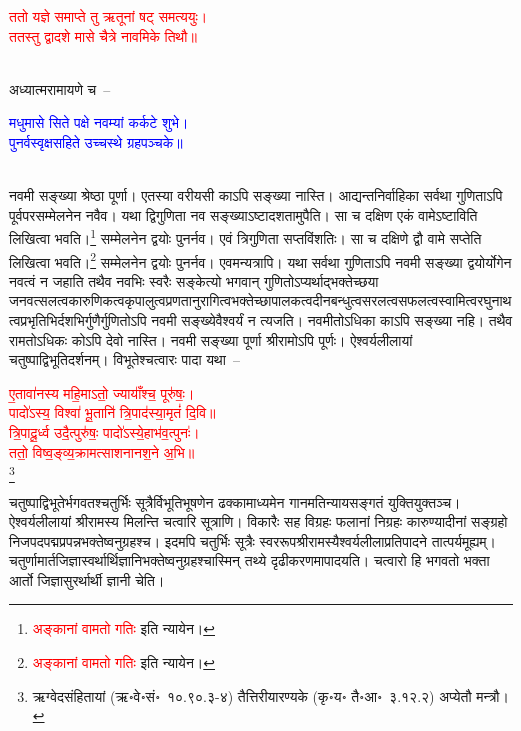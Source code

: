 \centering\textcolor{red}{ततो यज्ञे समाप्ते तु ऋतूनां षट् समत्ययुः।\nopagebreak\\
ततस्तु द्वादशे मासे चैत्रे नावमिके तिथौ॥}\nopagebreak\\
\\
\begin{sloppypar}\justifying\noindent अध्यात्म\-रामायणे च~–\end{sloppypar}
\centering\textcolor{blue}{मधुमासे सिते पक्षे नवम्यां कर्कटे शुभे।\nopagebreak\\
पुनर्वस्वृक्षसहिते उच्चस्थे ग्रहपञ्चके॥}\nopagebreak\\
\\
\begin{sloppypar}\justifying\noindent नवमी सङ्ख्या श्रेष्ठा पूर्णा। एतस्या वरीयसी काऽपि सङ्ख्या नास्ति। आद्यन्त\-निर्वाहिका सर्वथा गुणिताऽपि पूर्व\-पर\-सम्मेलनेन नवैव। यथा द्विगुणिता नव सङ्ख्याऽष्टादशतामुपैति। सा च दक्षिण एकं वामेऽष्टाविति लिखित्वा भवति।\footnote{\textcolor{red}{अङ्कानां वामतो गतिः} इति न्यायेन।} सम्मेलनेन द्वयोः पुनर्नव। एवं त्रि\-गुणिता सप्तविंशतिः। सा च दक्षिणे द्वौ वामे सप्तेति लिखित्वा भवति।\footnote{\textcolor{red}{अङ्कानां वामतो गतिः} इति न्यायेन।} सम्मेलनेन द्वयोः पुनर्नव। एवमन्यत्रापि। यथा सर्वथा गुणिताऽपि नवमी सङ्ख्या द्वयोर्योगेन नवत्वं न जहाति तथैव नवभिः स्वरैः सङ्केत्यो भगवान् गुणितोऽप्यर्थाद्भक्तेच्छया जनवत्सलत्व\-कारुणिकत्व\-कृपालुत्व\-प्रणतानुरागित्व\-भक्तेच्छा\-पालकत्व\-दीन\-बन्धुत्व\-सरलत्व\-सफलत्व\-स्वामित्व\-रघुनाथत्व\-प्रभृतिभिर्दशभिर्गुणैर्गुणितोऽपि नवमी सङ्ख्येवैश्वर्यं न त्यजति। नवमीतोऽधिका काऽपि सङ्ख्या नहि। तथैव रामतोऽधिकः कोऽपि देवो नास्ति। नवमी सङ्ख्या पूर्णा श्रीरामोऽपि पूर्णः। ऐश्वर्य\-लीलायां चतुष्पाद्विभूति\-दर्शनम्। विभूतेश्चत्वारः पादा यथा~–\end{sloppypar}
\centering\textcolor{red}{ए॒तावा॑नस्य महि॒माऽतो॒ ज्यायाँ॑श्च॒ पूरु॑षः॒।\nopagebreak\\
पादो॑ऽस्य॒ विश्वा॑ भू॒तानि॑ त्रि॒पाद॑स्या॒मृतं॑ दि॒वि॥\nopagebreak\\
त्रि॒पादू॒र्ध्व उदै॒त्पुरु॑षः॒ पादो॑ऽस्ये॒हाभ॑व॒त्पुनः॑।\nopagebreak\\
ततो॒ विष्व॒ङ्व्य॒क्रामत्साशनानश॒ने अ॒भि॥}\nopagebreak\\
\footnote{ऋग्वेद\-संहितायां (ऋ॰वे॰सं॰~१०.९०.३-४) तैत्तिरीयारण्यके (कृ॰य॰ तै॰आ॰~३.१२.२) अप्येतौ मन्त्रौ।}\\
\begin{sloppypar}\justifying\noindent चतुष्पाद्विभूतेर्भगवतश्चतुर्भिः सूत्रैर्विभूति\-भूषणेन ढक्का\-माध्यमेन गानमति\-न्याय\-सङ्गतं युक्ति\-युक्तञ्च। ऐश्वर्य\-लीलायां श्रीरामस्य मिलन्ति चत्वारि सूत्राणि। विकारैः सह विग्रहः फलानां निग्रहः कारुण्यादीनां सङ्ग्रहो निज\-पद\-पद्म\-प्रपन्न\-भक्तेष्वनुग्रहश्च। इदमपि
चतुर्भिः सूत्रैः
स्वररूप\-श्री\-रामस्यैश्वर्य\-लीला\-प्रतिपादने तात्पर्यमूह्यम्। चतुर्णामार्त\-जिज्ञास्वर्थार्थि\-ज्ञानि\-भक्तेष्वनु\-ग्रहश्चास्मिन् तथ्ये दृढीकरणमापादयति। चत्वारो हि भगवतो भक्ता आर्तो जिज्ञासुरर्थार्थी ज्ञानी चेति।\end{sloppypar}
